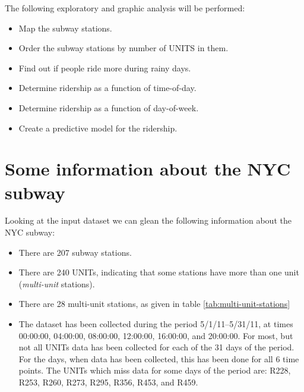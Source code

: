 \documentclass{article}
\begin{document}
The following exploratory and graphic analysis will be performed:
\begin{itemize}
\item Map the subway stations.
\item Order the subway stations by number of UNITS in them.
\item Find out if people ride more during rainy days.
\item Determine ridership as a function of time-of-day.
\item Determine ridership as a function of day-of-week.
\item Create a predictive model for the ridership.
\end{itemize}

\section{Some information about the NYC subway}

Looking at the input dataset we can glean the following information about the NYC subway:
\begin{itemize}
\item There are 207 subway stations.
\item There are 240 UNITs, indicating that some stations have more than one unit (\emph{multi-unit} stations).
\item There are 28 multi-unit stations, as given in table \ref{tab:multi-unit-stations}
\item The dataset has been collected during the period 5/1/11--5/31/11, at times 00:00:00, 04:00:00, 08:00:00, 12:00:00, 16:00:00, and 20:00:00. For most, but not all UNITs data has been collected for each of the 31 days of the period. For the days, when data has been collected, this has been done for all 6 time points. The UNITs  which miss data for some days of the period are: R228, R253, R260, R273, R295, R356, R453, and R459.
\end{itemize}
\end{document}
